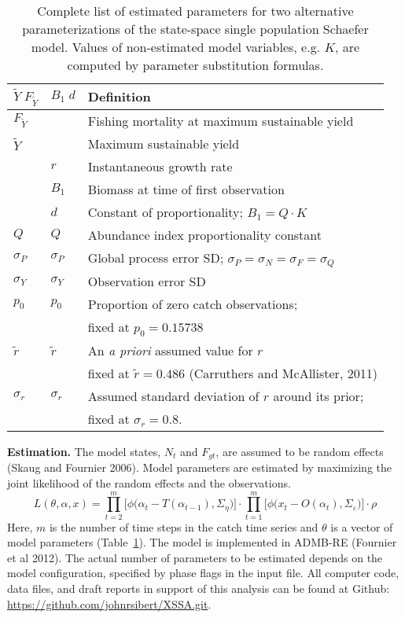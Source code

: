 \documentclass[12pt,letterpaper,twoside]{article}
\newcommand\MSY{\widetilde{Y}}
\newcommand\Fmsy{F_{\MSY}}
\begin{document}
\begin{table}
\caption{Complete list of estimated parameters for two alternative
parameterizations of the state-space single population Schaefer model.
Values of non-estimated model variables, e.g. $K$, are computed by
parameter substitution formulas.
\label{tab:allvars1}}
\begin{center}
\begin{tabular}{lll}
\hline
$\MSY\;\Fmsy$ & $B_1\;d$ & Definition\\
\hline
\hline
$\Fmsy$&  & Fishing mortality at maximum sustainable yield\\
$\MSY$ &  & Maximum sustainable yield\\
    & $r$ & Instantaneous growth rate\\
    & $B_1$ & Biomass at time of first observation\\
    &  $d $ & Constant of proportionality; $B_1=Q\cdot K$\\
$Q$ & $Q$ & Abundance index proportionality constant\\
$\sigma_P$ & $\sigma_P$ & Global process error SD; $\sigma_P=\sigma_N=\sigma_F=\sigma_Q$\\
$\sigma_Y$ & $\sigma_Y$ & Observation error SD \\
\hline
$p_0$ & $p_0$ & Proportion of zero catch observations;\\
      &       & fixed at $p_0 = 0.15738$\\
$\tilde{r}$ & $\tilde{r}$ & An {\it a priori} assumed value for $r$\\
            &             & fixed at $\tilde{r}=0.486$ (Carruthers and McAllister, 2011)\\
$\sigma_r$  & $\sigma_r$  & Assumed standard deviation of $r$ around its prior;\\
            &             & fixed at $\sigma_r=0.8$.\\
\hline
\end{tabular}
\end{center}
\end{table}



{\bf Estimation.} The model states, $N_t$ and $F_{gt}$, are assumed to be random
effects (Skaug and Fournier 2006). Model parameters are estimated by
maximizing the joint likelihood of the random
effects and the observations.
\begin{equation}
L(\theta,\alpha,x)=
\prod^m_{t=2}\big[\phi\big(\alpha_t-T(\alpha_{t-1}), \Sigma_\eta\big)\big]\cdot
\prod^m_{t=1}\big[\phi\big(x_t-O(\alpha_t),
\Sigma_\varepsilon\big)\big]\cdot\rho
\end{equation}
Here, $m$ is the number of time steps in the catch time series and
$\theta$ is a vector of model parameters (Table~\ref{tab:allvars1}).
The model is implemented in ADMB-RE (Fournier et al 2012).
The actual number of
parameters to be estimated depends on the model configuration,
specified by phase flags in the input file. 
All computer code, data files, and draft reports in support of this
analysis can be found at Github:
\url{https://github.com/johnrsibert/XSSA.git}.



\clearpage

\end{document}
